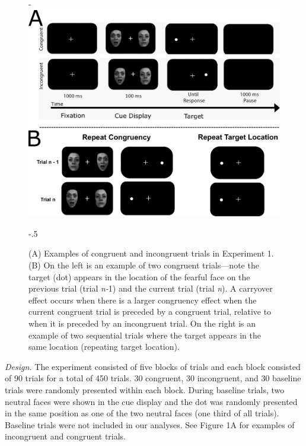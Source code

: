 \documentclass[issue,header,twocolumn,empirical, authordate,10pt]{jote-new-article}
\begin{document}
\begin{figure}[t!]
    \begin{adjustwidth}{-\fullwidthlen}{}
        \includegraphics[width=.95\linewidth]{./Figure1.png}
    \end{adjustwidth}
      \captionsetup{width=\dimexpr \linewidth + \fullwidthlen}
 \begin{adjustwidth}{-.5\fullwidthlen}{}
  \caption{(A) Examples of congruent and incongruent trials in Experiment 1. (B) On the left is an example of two congruent trials—note the target (dot) appears in the location of the fearful face on the previous trial (trial \emph{n-}1) and the current trial (trial \emph{n}). A carryover effect occurs when there is a larger congruency effect when the current congruent trial is preceded by a congruent trial, relative to when it is preceded by an incongruent trial. On the right is an example of two sequential trials where the target appears in the same location (repeating target location).}
  \end{adjustwidth}
\label{fig:fig1}
\end{figure}




\emph{Design. }The experiment consisted of five blocks of trials and each block consisted of 90 trials for a total of 450 trials. 30 congruent, 30 incongruent, and 30 baseline trials were randomly presented within each block. During baseline trials, two neutral faces were shown in the cue display and the dot was randomly presented in the same position as one of the two neutral faces (one third of all trials). Baseline trials were not included in our analyses. See Figure 1A for examples of incongruent and congruent trials.
\end{document}
